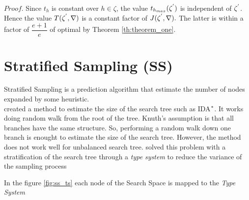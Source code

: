 $Proof.$ Since $t_{h}$ is constant over $h \in \zeta$, the value $t_{h_{max}}(\zeta\sp{'})$ is independent of $\zeta\sp{'}$. Hence the value $T(\zeta\sp{'},\nabla)$ is a constant factor of $J(\zeta\sp{'},\nabla).$ The latter is within a factor of $\dfrac{e+1}{e}$ of optimal by Theorem \ref{th:theorem_one}.

\section{Stratified Sampling (SS)}
Stratified Sampling is a prediction algorithm that estimate the number of nodes expanded by some heuristic.\\

\cite{knuth1975Estimating} created a method to estimate the size of the search tree such as IDA$\sp{*}$. It works doing random walk from the root of the tree. Knuth's assumption is that all branches have the same structure. So, performing a random walk down one branch is enought to estimate the size of the search tree. However, the method does not work well for unbalanced search tree. \cite{chen1992heuristic}
 solved this problem with a stratification of the search tree through a \textit{type system} to reduce the variance of the sampling process\cite{lelis2013predicting}

In the figure \ref{fig:ss_ts} each node of the Search Space is mapped to the \textit{Type System}

